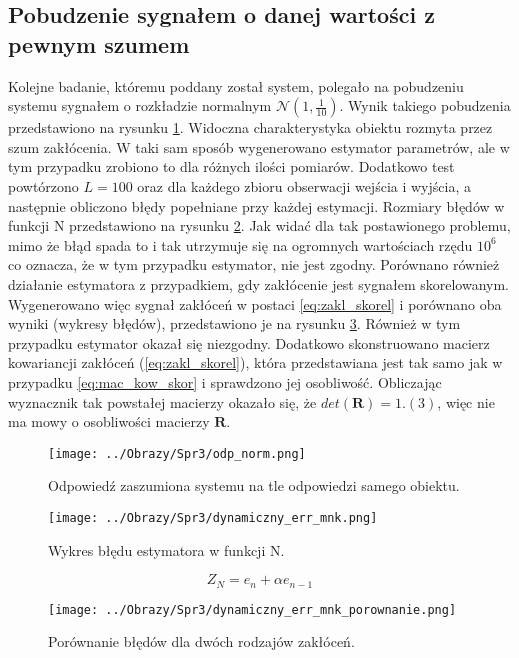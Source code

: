 \documentclass[12pt,a4paper]{article}
\begin{document}
\subsection{Pobudzenie sygnałem o danej wartości z pewnym szumem}
Kolejne badanie, któremu poddany został system, polegało na pobudzeniu systemu sygnałem o rozkładzie normalnym $\mathcal{N}(1,\frac{1}{10})$. Wynik takiego pobudzenia przedstawiono na rysunku \ref{fig:odp_norm}. 
Widoczna charakterystyka obiektu rozmyta przez szum zakłócenia.
W taki sam sposób wygenerowano estymator parametrów, ale w tym przypadku zrobiono to dla różnych ilości pomiarów.
Dodatkowo test powtórzono $L=100$ oraz dla każdego zbioru obserwacji wejścia i wyjścia, a następnie obliczono błędy popełniane przy każdej estymacji.
Rozmiary błędów w funkcji N przedstawiono na rysunku \ref{fig:blad_mnk}.
Jak widać dla tak postawionego problemu, mimo że błąd spada to i tak utrzymuje się na ogromnych wartościach rzędu $10^{6}$ co oznacza, że w tym przypadku estymator, nie jest zgodny.
Porównano również działanie estymatora z przypadkiem, gdy zakłócenie jest sygnałem skorelowanym.
Wygenerowano więc sygnał zakłóceń w postaci \ref{eq:zakl_skorel} i porównano oba wyniki (wykresy błędów), przedstawiono je na rysunku \ref{fig:blad_mnk_porownanie}.
Również w tym przypadku estymator okazał się niezgodny.
Dodatkowo skonstruowano macierz kowariancji zakłóceń (\ref{eq:zakl_skorel}), która przedstawiana jest tak samo jak w przypadku \ref{eq:mac_kow_skor} i sprawdzono jej osobliwość.
Obliczając wyznacznik tak powstałej macierzy okazało się, że $det(\boldsymbol{R})=1.(3)$, więc nie ma mowy o osobliwości macierzy $\boldsymbol{R}$.

\begin{figure}[H]
\centering
\texttt{[image: ../Obrazy/Spr3/odp\_norm.png]} 
\caption{Odpowiedź zaszumiona systemu na tle odpowiedzi samego obiektu.}
\label{fig:odp_norm}
\end{figure}

\begin{figure}[H]
\centering
\texttt{[image: ../Obrazy/Spr3/dynamiczny\_err\_mnk.png]} 
\caption{Wykres błędu estymatora w funkcji N.}
\label{fig:blad_mnk}
\end{figure}

\begin{equation}\label{eq:zakl_skorel}
Z_{N}=e_{n}+\alpha e_{n-1}
\end{equation}

\begin{figure}[H]
\centering
\texttt{[image: ../Obrazy/Spr3/dynamiczny\_err\_mnk\_porownanie.png]} 
\caption{Porównanie błędów dla dwóch rodzajów zakłóceń.}
\label{fig:blad_mnk_porownanie}
\end{figure}
\end{document}
